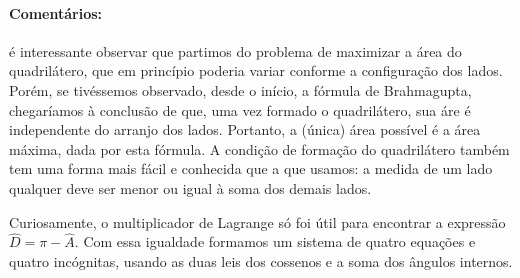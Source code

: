 \documentclass[a4paper,12pt]{scrartcl}
\begin{document}
  \paragraph{Comentários:} é interessante observar que partimos do problema de maximizar a área do quadrilátero, que em princípio poderia variar conforme a configuração dos lados. Porém, se tivéssemos observado, desde o início, a fórmula de Brahmagupta, chegaríamos à conclusão de que, uma vez formado o quadrilátero, sua áre é independente do arranjo dos lados. Portanto, a (única) área possível é a área máxima, dada por esta fórmula. A condição de formação do quadrilátero também tem uma forma mais fácil e conhecida que a que usamos: a medida de um lado qualquer deve ser menor ou igual à soma dos demais lados.
  
  Curiosamente, o multiplicador de Lagrange só foi útil para encontrar a expressão $\hat D = \pi - \hat A$. Com essa igualdade formamos um sistema de quatro equações e quatro incógnitas, usando as duas leis dos cossenos e a soma dos ângulos internos.







  

  
  
  
\end{document}
